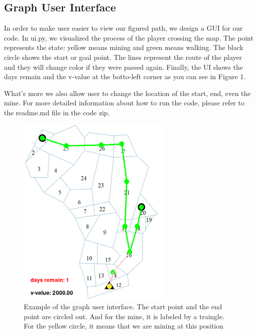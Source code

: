 \documentclass[10pt,twocolumn,letterpaper]{article}
\begin{document}
\subsection{Graph User Interface}
In order to make user easier to view our figured path, we design a GUI for our code.
In ui.py, we visualized the process of the player crossing the map. 
The point represents the state: yellow means mining and green means walking. 
The black circle shows the start or goal point. 
The lines represent the route of the player and they will change color if 
they were passed again. Finally, the UI shows the days remain and the v-value 
at the botto-left corner as you can see in Figure 1.

What's more we also allow user to change the location of the start, end, even the mine. 
For more detailed information about how to run the code, please refer to the readme.md file
in the code zip.
\begin{figure}[t]
   \begin{center}   
   \includegraphics[width=0.8\linewidth]{sample.png}
   \end{center}
      \caption{Example of the graph user interface. 
      The start point and the end point are circled out. 
      And for the mine, it is labeled by a traingle. 
      For the yellow circle, 
      it means that we are mining at this position}
   \label{fig:long}
   \label{fig:onecol}
   \end{figure}
\end{document}

